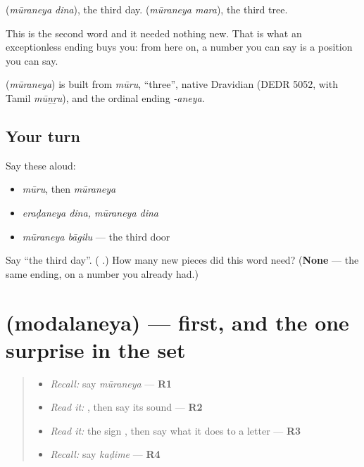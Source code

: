 \textbf{ } (\emph{mūraneya dina}), the third day. \textbf{ } (\emph{mūraneya mara}), the third tree.

This is the second word and it needed nothing new. That is what an exceptionless ending buys you: from here on, a number you can say is a position you can say.

\begin{cousinweb}
\textbf{} (\emph{mūraneya}) is built from \emph{mūru}, \textquotedblleft{}three\textquotedblright{}, native Dravidian (DEDR 5052, with Tamil \emph{mūṉṟu}), and the ordinal ending \emph{-aneya}.
\end{cousinweb}

\subsection*{Your turn}
Say these aloud:

\begin{itemize}
\raggedright
  \item \emph{mūru}, then \emph{mūraneya}
  \item \emph{eraḍaneya dina, mūraneya dina}
  \item \emph{mūraneya bāgilu} — the third door
\end{itemize}

\begin{tcolorbox}[breakable,colback=teal!4,colframe=teal!35!black,title={Before you move on}]
Say \textquotedblleft{}the third day\textquotedblright{}. (\textbf{ }.) How many new pieces did this word need? (\textbf{None} — the same ending, on a number you already had.)
\end{tcolorbox}
\section[\texorpdfstring{\kn{ಮೊದಲನೆಯ} (modalaneya)}{ಮೊದಲನೆಯ (modalaneya)}]{ (modalaneya) — first, and the one surprise in the set}

\label{lesson:KA-C74-first}



\begin{quote}
\begin{itemize}
\raggedright
  \item \emph{Recall:} say \emph{mūraneya} — \textbf{R1}
  \item \emph{Read it:} \textbf{}, then say its sound — \textbf{R2}
  \item \emph{Read it:} the sign \textbf{}, then say what it does to a letter — \textbf{R3}
  \item \emph{Recall:} say \emph{kaḍime} — \textbf{R4}
\end{itemize}
\end{quote}

